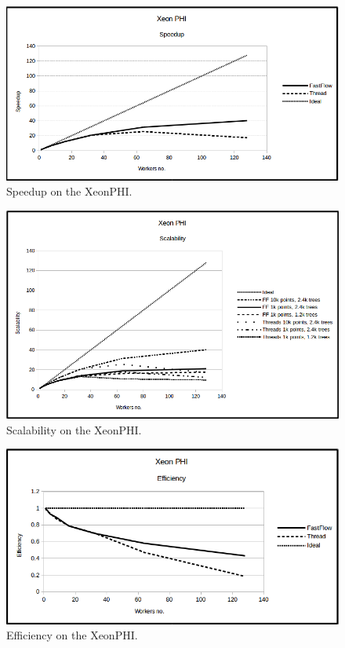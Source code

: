 \documentclass[10pt]{article}
\numberwithin{equation}{section}
\begin{document}
\begin{figure} 
	\centering
	\includegraphics[scale=.5]{XeonPHI_Speedup.png}
	\caption{Speedup on the XeonPHI.}
	\label{fig:xeonphispeedup}
\end{figure}

\begin{figure} 
	\centering
	\includegraphics[scale=.75]{XeonPHI_Scalability.png}
	\caption{Scalability on the XeonPHI.}
	\label{fig:xeonphiscalability}
\end{figure}

\begin{figure} 
	\centering
	\includegraphics[scale=.5]{XeonPHI_Efficiency.png}
	\caption{Efficiency on the XeonPHI.}
	\label{fig:xeonphiefficiency}
\end{figure}
\end{document}
